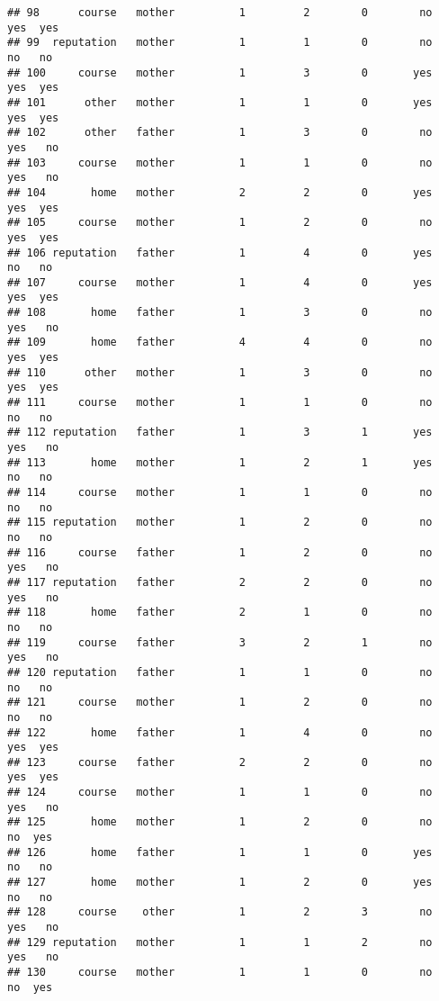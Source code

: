\documentclass[
]{article}
\begin{document}
\begin{verbatim}
## 98      course   mother          1         2        0        no    yes  yes
## 99  reputation   mother          1         1        0        no     no   no
## 100     course   mother          1         3        0       yes    yes  yes
## 101      other   mother          1         1        0       yes    yes  yes
## 102      other   father          1         3        0        no    yes   no
## 103     course   mother          1         1        0        no    yes   no
## 104       home   mother          2         2        0       yes    yes  yes
## 105     course   mother          1         2        0        no    yes  yes
## 106 reputation   father          1         4        0       yes     no   no
## 107     course   mother          1         4        0       yes    yes  yes
## 108       home   father          1         3        0        no    yes   no
## 109       home   father          4         4        0        no    yes  yes
## 110      other   mother          1         3        0        no    yes  yes
## 111     course   mother          1         1        0        no     no   no
## 112 reputation   father          1         3        1       yes    yes   no
## 113       home   mother          1         2        1       yes     no   no
## 114     course   mother          1         1        0        no     no   no
## 115 reputation   mother          1         2        0        no     no   no
## 116     course   father          1         2        0        no    yes   no
## 117 reputation   father          2         2        0        no    yes   no
## 118       home   father          2         1        0        no     no   no
## 119     course   father          3         2        1        no    yes   no
## 120 reputation   father          1         1        0        no     no   no
## 121     course   mother          1         2        0        no     no   no
## 122       home   father          1         4        0        no    yes  yes
## 123     course   father          2         2        0        no    yes  yes
## 124     course   mother          1         1        0        no    yes   no
## 125       home   mother          1         2        0        no     no  yes
## 126       home   father          1         1        0       yes     no   no
## 127       home   mother          1         2        0       yes     no   no
## 128     course    other          1         2        3        no    yes   no
## 129 reputation   mother          1         1        2        no    yes   no
## 130     course   mother          1         1        0        no     no  yes

\end{verbatim}
\end{document}
